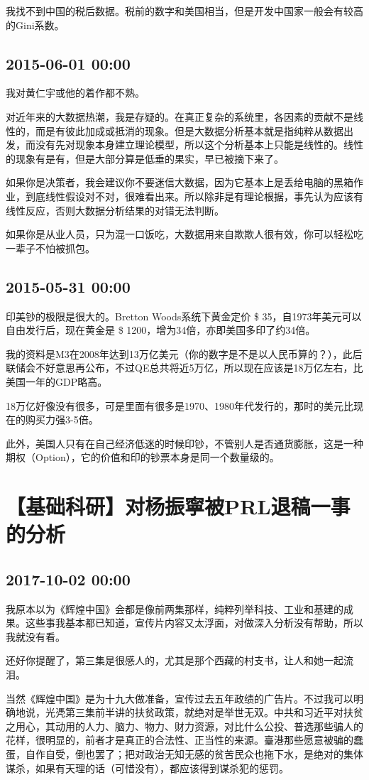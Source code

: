 \documentclass[twocolumn]{ctexart}
\begin{document}
我找不到中国的税后数据。税前的数字和美国相当，但是开发中国家一般会有较高的Gini系数。\subsection*{2015-06-01 00:00}
我对黄仁宇或他的着作都不熟。

对近年来的大数据热潮，我是存疑的。在真正复杂的系统里，各因素的贡献不是线性的，而是有彼此加成或抵消的现象。但是大数据分析基本就是指纯粹从数据出发，而没有先对现象本身建立理论模型，所以这个分析基本上只能是线性的。线性的现象有是有，但是大部分算是低垂的果实，早已被摘下来了。

如果你是决策者，我会建议你不要迷信大数据，因为它基本上是丢给电脑的黑箱作业，到底线性假设对不对，很难看出来。所以除非是有理论根据，事先认为应该有线性反应，否则大数据分析结果的对错无法判断。

如果你是从业人员，只为混一口饭吃，大数据用来自欺欺人很有效，你可以轻松吃一辈子不怕被抓包。\subsection*{2015-05-31 00:00}
印美钞的极限是很大的。Bretton Woods系统下黄金定价 \$ 35，自1973年美元可以自由发行后，现在黄金是 \$ 1200，增为34倍，亦即美国多印了约34倍。

我的资料是M3在2008年达到13万亿美元（你的数字是不是以人民币算的？），此后联储会不好意思再公布，不过QE总共将近5万亿，所以现在应该是18万亿左右，比美国一年的GDP略高。

18万亿好像没有很多，可是里面有很多是1970、1980年代发行的，那时的美元比现在的购买力强3-5倍。

此外，美国人只有在自己经济低迷的时候印钞，不管别人是否通货膨胀，这是一种期权（Option），它的价值和印的钞票本身是同一个数量级的。\section*{【基础科研】对杨振寧被PRL退稿一事的分析}
\subsection*{2017-10-02 00:00}
我原本以为《辉煌中国》会都是像前两集那样，纯粹列举科技、工业和基建的成果。这些事我基本都已知道，宣传片内容又太浮面，对做深入分析没有帮助，所以我就没有看。

还好你提醒了，第三集是很感人的，尤其是那个西藏的村支书，让人和她一起流泪。

当然《辉煌中国》是为十九大做准备，宣传过去五年政绩的广告片。不过我可以明确地说，光凴第三集前半讲的扶贫政策，就绝对是举世无双。中共和习近平对扶贫之用心，其动用的人力、脑力、物力、财力资源，对比什么公投、普选那些骗人的花样，很明显的，前者才是真正的合法性、正当性的来源。臺港那些愿意被骗的蠢蛋，自作自受，倒也罢了；把对政治无知无感的贫苦民众也拖下水，是绝对的集体谋杀，如果有天理的话（可惜没有），都应该得到谋杀犯的惩罚。
\end{document}
